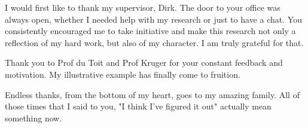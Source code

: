
\begin{acknowledgements}      

I would first like to thank my supervisor, Dirk. The door to your office was always open, whether I needed help with my research or just to have a chat. You consistently encouraged me to take initiative and make this research not only a reflection of my hard work, but also of my character. I am truly grateful for that.

Thank you to Prof du Toit and Prof Kruger for your constant feedback and motivation. My illustrative example has finally come to fruition.

Endless thanks, from the bottom of my heart, goes to my amazing family. All of those times that I said to you, "I think I've figured it out" actually mean something now.

\end{acknowledgements}
